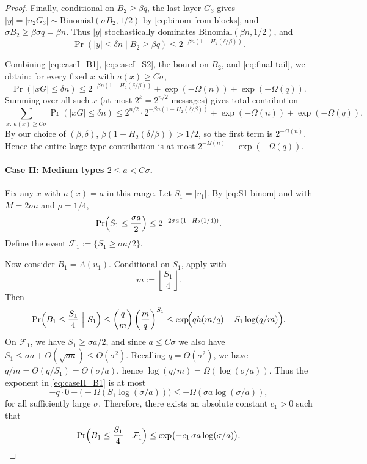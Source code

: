 \begin{proof}
Finally, conditional on $B_2\ge \beta q$, the last layer $G_3$ gives
$|y|=|u_2G_3|\sim \mathrm{Binomial}(\sigma B_2,1/2)$ by \eqref{eq:binom-from-blocks}, and $\sigma B_2\ge \beta\sigma q=\beta n$.
Thus $|y|$ stochastically dominates $\mathrm{Binomial}(\beta n,1/2)$, and
\begin{equation}\label{eq:final-tail}
\Pr(|y|\le \delta n\mid B_2\ge \beta q)\le 2^{-\beta n(1-H_2(\delta/\beta))}.
\end{equation}

Combining \eqref{eq:caseI_B1}, \eqref{eq:caseI_S2}, the bound on $B_2$, and \eqref{eq:final-tail}, we obtain:
for every fixed $x$ with $a(x)\ge C\sigma$,
\[
\Pr(|xG|\le \delta n)\le 2^{-\beta n(1-H_2(\delta/\beta))}+\exp(-\Omega(n))+\exp(-\Omega(q)).
\]
Summing over all such $x$ (at most $2^k=2^{n/2}$ messages) gives total contribution
\[
\sum_{x:\ a(x)\ge C\sigma}\Pr(|xG|\le \delta n)
\le 2^{n/2}\cdot 2^{-\beta n(1-H_2(\delta/\beta))}+\exp(-\Omega(n))+\exp(-\Omega(q)).
\]
By our choice of $(\beta,\delta)$, $\beta(1-H_2(\delta/\beta))>1/2$, so the first term is $2^{-\Omega(n)}$.
Hence the entire large-type contribution is at most $2^{-\Omega(n)}+\exp(-\Omega(q))$.

\paragraph{Case II: Medium types $2\le a < C\sigma$.}
Fix any $x$ with $a(x)=a$ in this range.
Let $S_1=|v_1|$. By \eqref{eq:S1-binom} and  with $M=2\sigma a$ and $\rho=1/4$,
\begin{equation}\label{eq:caseII_S1}
\Pr\Bigl(S_1\le \frac{\sigma a}{2}\Bigr)
\le 2^{-2\sigma a\,(1-H_2(1/4))}.
\end{equation}
Define the event $\mathcal F_1:=\{S_1\ge \sigma a/2\}$.

Now consider $B_1=A(u_1)$. Conditional on $S_1$, apply  with
\[
m:=\left\lfloor \frac{S_1}{4}\right\rfloor.
\]
Then
\begin{equation}\label{eq:caseII_B1}
\Pr\Bigl(B_1\le \frac{S_1}{4}\ \Big|\ S_1\Bigr)
\le \binom{q}{m}\left(\frac{m}{q}\right)^{S_1}
\le \exp\!\Bigl(q h(m/q)-S_1\log(q/m)\Bigr).
\end{equation}
On $\mathcal F_1$, we have $S_1\ge \sigma a/2$, and since $a\le C\sigma$ we also have $S_1\le \sigma a + O(\sqrt{\sigma a})\le O(\sigma^2)$.
Recalling $q=\Theta(\sigma^2)$, we have $q/m=\Theta(q/S_1)=\Theta(\sigma/a)$, hence $\log(q/m)=\Omega(\log(\sigma/a))$.
Thus the exponent in \eqref{eq:caseII_B1} is at most
\[
-q\cdot 0 + \bigl(-\Omega(S_1\log(\sigma/a))\bigr)\le -\Omega(\sigma a\log(\sigma/a)),
\]
for all sufficiently large $\sigma$.
Therefore, there exists an absolute constant $c_1>0$ such that
\begin{equation}\label{eq:caseII_B1_simple}
\Pr\Bigl(B_1\le \frac{S_1}{4}\ \Big|\ \mathcal F_1\Bigr)\le \exp\bigl(-c_1\,\sigma a\log(\sigma/a)\bigr).
\end{equation}


\end{proof}
